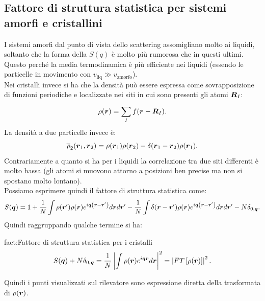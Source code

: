 \subsection{Fattore di struttura statistica per sistemi amorfi e cristallini}
\label{subsec:Fattore di struttura statistica per sistemi amorfi e cristallini}
I sistemi amorfi dal punto di vista dello scattering assomigliano molto ai liquidi, soltanto che la forma della $S(q)$ è molto più rumorosa che in questi ultimi.\\
Questo perché la media termodinamica è più efficiente nei liquidi (essendo le particelle in movimento con $v_\text{liq} \gg v_\text{amorfo} $).\\
Nei cristalli invece si ha che la densità può essere espressa come sovrapposizione di funzioni periodiche e localizzate nei siti in cui sono presenti gli atomi $\boldsymbol{R}_I$:
\[
	\rho (\boldsymbol{r}) 
	=
	\sum_{I}^{} f(\boldsymbol{r}-\boldsymbol{R}_I)
.\] 
La densità a due particelle invece è:
\[
	\overline{\rho} _2(\boldsymbol{r}_1,\boldsymbol{r}_2) 
	=
	\rho (\boldsymbol{r}_1)\rho (\boldsymbol{r}_2) - \delta(\boldsymbol{r}_1-\boldsymbol{r}_2)\rho (\boldsymbol{r}_1)
.\] 
Contrariamente a quanto si ha per i liquidi la correlazione tra due siti differenti è molto bassa (gli atomi si muovono attorno a posizioni ben precise ma non si spostano molto lontano).\\
Possiamo esprimere quindi il fattore di struttura statistica come:
\[
	S(\boldsymbol{q}) =
	1 + \frac{1}{N}\int \rho (\boldsymbol{r}')\rho (\boldsymbol{r}) e^{i \boldsymbol{q}\left( \boldsymbol{r}-\boldsymbol{r}' \right) }d \boldsymbol{r}d \boldsymbol{r}'
	-
	\frac{1}{N}\int\delta(\boldsymbol{r}-\boldsymbol{r}')\rho (\boldsymbol{r})e^{i \boldsymbol{q}\left( \boldsymbol{r}-\boldsymbol{r}' \right)} d \boldsymbol{r} d \boldsymbol{r}' 
	- N \delta_{0,\boldsymbol{q}}
.\] 
Quindi raggruppando qualche termine si ha:
\begin{fact}{fact:Fattore di struttura statistica per i cristalli}
	\[
		S(\boldsymbol{q}) + N \delta_{0,\boldsymbol{q}} 
		=
		\frac{1}{N}\left| \int\rho (\boldsymbol{r})e^{i \boldsymbol{q}\boldsymbol{r}} d \boldsymbol{r} \right|^2 = \left| FT\left[ \rho (\boldsymbol{r}) \right]  \right| ^2
	.\] 
\end{fact}
Quindi i punti visualizzati sul rilevatore sono espressione diretta della trasformata di $\rho (\boldsymbol{r})$. \\

